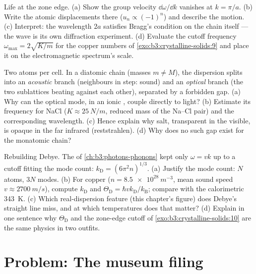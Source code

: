 \begin{exercise}[$\star\star\star$]\label{exo:b3:crystalline-solids:10}
Life at the zone edge. (a) Show the group velocity
$\dd\omega/\dd k$ vanishes at $k = \pi/a$. (b) Write the atomic
displacements there ($u_n \propto (-1)^n$) and describe the
motion. (c) Interpret: the wavelength $2a$ satisfies Bragg's
condition on the chain itself --- the wave is its own diffraction
experiment. (d) Evaluate the cutoff frequency
$\omega_{\text{max}} = 2\sqrt{K/m}$ for the copper numbers of
\cref{exo:b3:crystalline-solids:9} and place it on the
electromagnetic spectrum's scale.
\end{exercise}

\begin{exercise}[$\star\star\star$]\label{exo:b3:crystalline-solids:11}
Two atoms per cell. In a diatomic chain (masses $m \ne M$), the
dispersion splits into an \emph{acoustic} branch (neighbours in
step: sound) and an \emph{optical} branch (the two sublattices
beating against each other), separated by a forbidden gap. (a) Why
can the optical mode, in an ionic , couple directly to
light? (b) Estimate its frequency for NaCl ($K \approx
\qty{25}{N/m}$, reduced mass of the Na--Cl pair) and the
corresponding wavelength. (c) Hence explain why salt, transparent
in the visible, is opaque in the far infrared (reststrahlen). (d)
Why does no such gap exist for the monatomic chain?
\end{exercise}

\begin{exercise}[$\star\star\star$]\label{exo:b3:crystalline-solids:12}
Rebuilding Debye. The  of \cref{ch:b3:photons-phonons}
kept only $\omega = vk$ up to a cutoff fitting the mode count:
$k_{\text{D}} = (6\pi^2n)^{1/3}$. (a) Justify the mode count:
$N$ atoms, $3N$ modes. (b) For copper ($n = \qty{8.5e28}{m^{-3}}$,
mean sound speed $v \approx \qty{2700}{m/s}$), compute
$k_{\text{D}}$ and $\Theta_{\text{D}} =
\hbar vk_{\text{D}}/k_{\text{B}}$; compare with the calorimetric
\qty{343}{K}. (c) Which real-dispersion feature (this chapter's
figure) does Debye's straight line miss, and at which temperatures
does that matter? (d) Explain in one sentence why
$\Theta_{\text{D}}$ and the zone-edge cutoff of
\cref{exo:b3:crystalline-solids:10} are the same physics in two
outfits.
\end{exercise}

\section{Problem: The museum filing}

